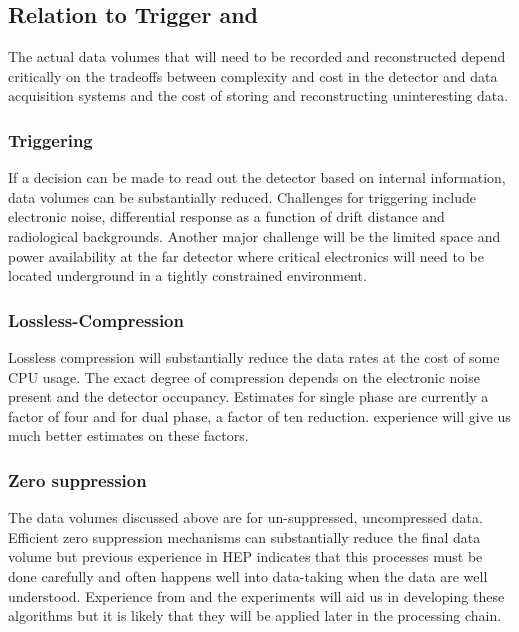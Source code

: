 \subsection{Relation to Trigger and }

The actual data volumes that will need to be recorded and reconstructed depend critically on the tradeoffs between complexity and cost in the detector and data acquisition systems and the cost of storing and reconstructing uninteresting data.

\subsubsection{Triggering}

If a decision can be made to read  out the detector based on internal information, data volumes can be substantially reduced.  
Challenges for triggering include electronic noise, differential response as a function of drift distance and radiological backgrounds.
Another major challenge will be the limited space and power availability at the far detector where critical electronics will need to be located underground in a tightly constrained environment.

\subsubsection{Lossless-Compression}

Lossless compression will substantially reduce the data rates at the cost of some CPU usage.  The exact degree of compression  depends on the electronic noise present and the detector occupancy.  Estimates for single phase are currently a factor of four and for dual phase, a factor of ten reduction.   experience will give us much better estimates on these factors.


\subsubsection{Zero suppression}

The data volumes discussed above are for un-suppressed, uncompressed data.  Efficient zero suppression mechanisms can substantially reduce the final data volume but previous experience in HEP indicates that this processes must be done carefully and often happens well into data-taking when the data are well understood.  Experience from   and the  experiments will aid us in developing these algorithms but it is likely that they will be applied later in the processing chain.  

